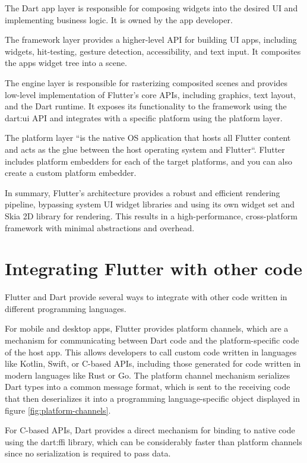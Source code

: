 \documentclass[conference]{IEEEtran}
\begin{document}
The Dart app layer is responsible for composing widgets into the desired UI and implementing business logic. It is owned by the app developer.

The framework layer provides a higher-level API for building UI apps, including widgets, hit-testing, gesture detection, accessibility, and text input. It composites the apps widget tree into a scene.

The engine layer is responsible for rasterizing composited scenes and provides low-level implementation of Flutter's core APIs, including graphics, text layout, and the Dart runtime. It exposes its functionality to the framework using the dart:ui API and integrates with a specific platform using the platform layer.

The platform layer ``is the native OS application that hosts all Flutter content and acts as the glue between the host operating system and Flutter``\cite{b1.1}. Flutter includes platform embedders for each of the target platforms, and you can also create a custom platform embedder.

In summary, Flutter's architecture provides a robust and efficient rendering pipeline, bypassing system UI widget libraries and using its own widget set and Skia 2D library \cite{b1.2} for rendering. This results in a high-performance, cross-platform framework with minimal abstractions and overhead.

\section{Integrating Flutter with other code}

Flutter and Dart provide several ways to integrate with other code written in different programming languages.

For mobile and desktop apps, Flutter provides platform channels, which are a mechanism for communicating between Dart code and the platform-specific code of the host app. This allows developers to call custom code written in languages like Kotlin, Swift, or C-based APIs, including those generated for code written in modern languages like Rust or Go. The platform channel mechanism serializes Dart types into a common message format, which is sent to the receiving code that then deserializes it into a programming language-specific object displayed in figure \ref{fig:platform-channels}. 

For C-based APIs, Dart provides a direct mechanism for binding to native code using the dart:ffi library, which can be considerably faster than platform channels since no serialization is required to pass data.
\end{document}
